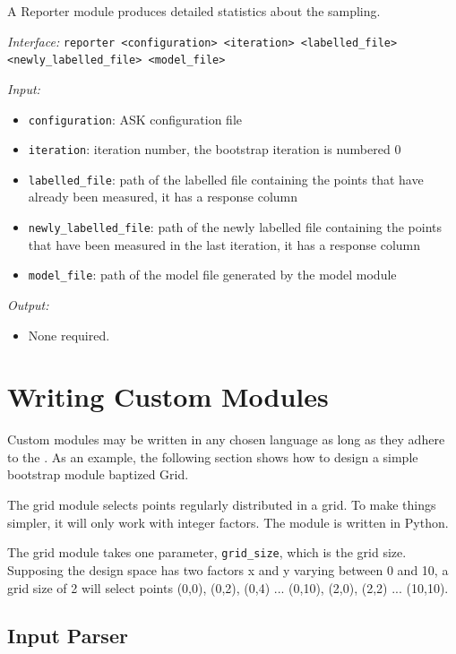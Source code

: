 A Reporter module produces detailed statistics about the sampling.

\emph{Interface:} \texttt{reporter \textless{}configuration\textgreater{} \textless{}iteration\textgreater{} \textless{}labelled\_file\textgreater{} \textless{}newly\_labelled\_file\textgreater{} \textless{}model\_file\textgreater{}} 

\emph{Input:}
\begin{itemize}
	\item \texttt{configuration}: ASK configuration file
	\item \texttt{iteration}: iteration number, the bootstrap iteration is numbered 0
	\item \texttt{labelled\_file}: path of the labelled file containing the points that have already been measured, it has a response column
	\item \texttt{newly\_labelled\_file}: path of the newly labelled file containing the points that have been measured in the last iteration, it has a response column
	\item \texttt{model\_file}: path of the model file generated by the model module
\end{itemize}

\emph{Output:}
\begin{itemize}
	\item None required.
\end{itemize}

\section{Writing Custom Modules}

Custom modules may be written in any chosen language as long as they adhere to the .
As an example, the following section shows how to design a simple bootstrap module baptized Grid.

The grid module selects points regularly distributed in a grid. To make things simpler, it will only work with integer factors. The module is written in Python.

The grid module takes one parameter, \texttt{grid\_size}, which is the grid size. 
Supposing the design space has two factors x and y varying between 0 and 10, a grid size of 2 will select points (0,0), (0,2), (0,4) ... (0,10), (2,0), (2,2) ... (10,10).

\subsection{Input Parser}

